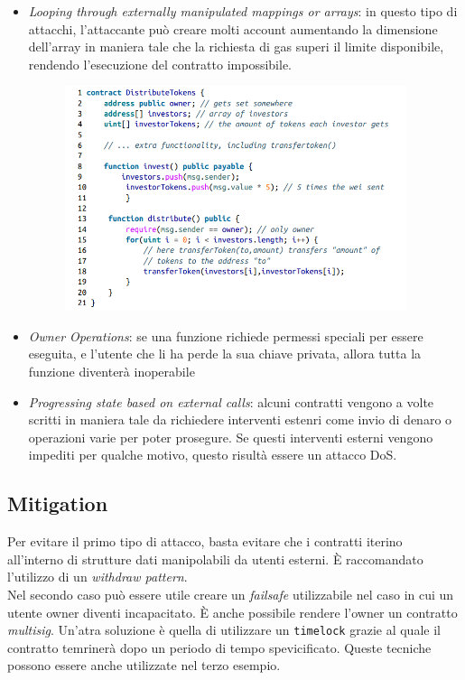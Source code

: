 \begin{itemize}
      \item \textit{Looping through externally manipulated mappings or arrays}:
            in questo tipo di attacchi, l'attaccante può creare molti account aumentando
            la dimensione dell'array in maniera tale che la richiesta di gas superi il
            limite disponibile, rendendo l'esecuzione del contratto impossibile.
            \begin{figure}[H]
                  \centering
                  \includegraphics[width=10cm, keepaspectratio]{capitoli/ethereum/imgs/dos_looping.png}
            \end{figure}
      \item \textit{Owner Operations}:
            se una funzione richiede permessi speciali per essere eseguita,
            e l'utente che li ha perde la sua chiave privata,
            allora tutta la funzione diventerà inoperabile
      \item \textit{Progressing state based on external calls}:
            alcuni contratti vengono a volte scritti in maniera tale da richiedere
            interventi estenri come invio di denaro o operazioni varie per poter
            prosegure. Se questi interventi esterni vengono impediti per qualche motivo,
            questo risultà essere un attacco DoS.
\end{itemize}

\subsection{Mitigation}

Per evitare il primo tipo di attacco,
basta evitare che i contratti iterino all'interno di strutture dati manipolabili
da utenti esterni. È raccomandato l'utilizzo di un \textit{withdraw pattern}.\\

Nel secondo caso può essere utile creare un \textit{failsafe} utilizzabile nel
caso in cui un utente owner diventi incapacitato.
È anche possibile rendere l'owner un contratto \textit{multisig}.
Un'atra soluzione è quella di utilizzare un \verb|timelock| grazie al quale il
contratto temrinerà dopo un periodo di tempo spevicificato.
Queste tecniche possono essere anche utilizzate nel terzo esempio.